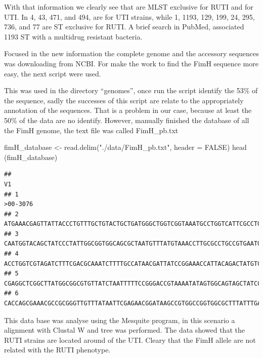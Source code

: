 \documentclass[
]{article}
\newenvironment{Shaded}{\begin{snugshade}}{\end{snugshade}}
\newcommand{\AttributeTok}[1]{\textcolor[rgb]{0.77,0.63,0.00}{#1}}
\newcommand{\ConstantTok}[1]{\textcolor[rgb]{0.00,0.00,0.00}{#1}}
\newcommand{\FunctionTok}[1]{\textcolor[rgb]{0.00,0.00,0.00}{#1}}
\newcommand{\NormalTok}[1]{#1}
\newcommand{\OtherTok}[1]{\textcolor[rgb]{0.56,0.35,0.01}{#1}}
\newcommand{\StringTok}[1]{\textcolor[rgb]{0.31,0.60,0.02}{#1}}
\begin{document}
With that information we clearly see that are MLST exclusive for RUTI
and for UTI. In 4, 43, 471, and 494, are for UTI strains, while 1, 1193,
129, 199, 24, 295, 736, and 77 are ST exclusive for RUTI. A brief search
in PubMed, associated 1193 ST with a multidrug resistant bacteria.

Focused in the new information the complete genome and the accessory
sequences was downloading from NCBI. For make the work to find the FimH
sequence more easy, the next script were used.

This was used in the directory ``genomes'', once run the script identify
the 53\% of the sequence, sadly the successes of this script are relate
to the appropriately annotation of the sequences. That is a problem in
our case, because at least the 50\% of the data are no identify.
However, manually finished the database of all the FimH genome, the text
file was called FimH\_pb.txt

\begin{Shaded}
\begin{Highlighting}[]
\NormalTok{fimH\_database }\OtherTok{\textless{}{-}} \FunctionTok{read.delim}\NormalTok{(}\StringTok{"./data/FimH\_pb.txt"}\NormalTok{, }\AttributeTok{header =} \ConstantTok{FALSE}\NormalTok{)}
\FunctionTok{head}\NormalTok{ (fimH\_database)}
\end{Highlighting}
\end{Shaded}

\begin{verbatim}
##                                                                                 V1
## 1                                                                         >00-3076
## 2 ATGAAACGAGTTATTACCCTGTTTGCTGTACTGCTGATGGGCTGGTCGGTAAATGCCTGGTCATTCGCCTGTAAAACCGC
## 3 CAATGGTACAGCTATCCCTATTGGCGGTGGCAGCGCTAATGTTTATGTAAACCTTGCGCCTGCCGTGAATGTGGGGCAAA
## 4 ACCTGGTCGTAGATCTTTCGACGCAAATCTTTTGCCATAACGATTATCCGGAAACCATTACAGACTATGTCACACTGCAA
## 5 CGAGGCTCGGCTTATGGCGGCGTGTTATCTAATTTTTCCGGGACCGTAAAATATAGTGGCAGTAGCTATCCATTTCCGAC
## 6 CACCAGCGAAACGCCGCGGGTTGTTTATAATTCGAGAACGGATAAGCCGTGGCCGGTGGCGCTTTATTTGACGCCTGTGA
\end{verbatim}

This data base was analyse using the Mesquite program, in this scenario
a alignment with Clustal W and tree was performed. The data showed that
the RUTI strains are located around of the UTI. Cleary that the FimH
allele are not related with the RUTI phenotype.
\end{document}

